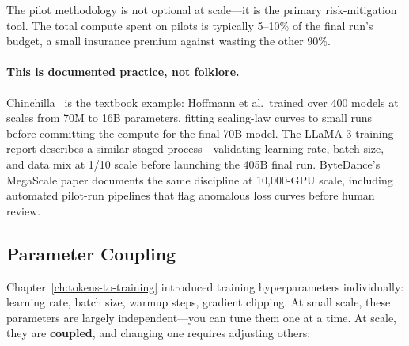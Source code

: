 The pilot methodology is not optional at scale---it is the primary risk-mitigation tool. The total compute spent on pilots is typically 5--10\% of the final run's budget, a small insurance premium against wasting the other 90\%.

\paragraph{This is documented practice, not folklore.} Chinchilla~\cite{hoffmann2022training} is the textbook example: Hoffmann et al.\ trained over 400 models at scales from 70M to 16B parameters, fitting scaling-law curves to small runs before committing the compute for the final 70B model. The LLaMA-3 training report describes a similar staged process---validating learning rate, batch size, and data mix at 1/10 scale before launching the 405B final run. ByteDance's MegaScale paper documents the same discipline at 10,000-GPU scale, including automated pilot-run pipelines that flag anomalous loss curves before human review.

\subsection{Parameter Coupling}

Chapter~\ref{ch:tokens-to-training} introduced training hyperparameters individually: learning rate, batch size, warmup steps, gradient clipping. At small scale, these parameters are largely independent---you can tune them one at a time. At scale, they are \textbf{coupled}, and changing one requires adjusting others:

